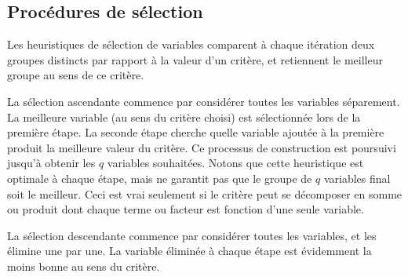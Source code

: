 \subsection{Proc\'edures de s\'election}

Les heuristiques de s\'election de variables comparent \`a chaque it\'eration 
deux groupes distincts par rapport \`a la valeur d'un crit\`ere, et
retiennent le meilleur groupe au sens de ce crit\`ere.

La s\'election ascendante commence par consid\'erer toutes les variables
s\'eparement. La meilleure variable (au sens du crit\`ere choisi) est 
s\'electionn\'ee lors de la premi\`ere \'etape. La seconde \'etape cherche
quelle variable ajout\'ee \`a la premi\`ere produit la meilleure valeur
du crit\`ere. Ce processus de construction est poursuivi jusqu'\`a obtenir
les $q$ variables souhait\'ees. Notons que cette heuristique est optimale
\`a chaque \'etape, mais ne garantit pas que le groupe de $q$ variables
final soit le meilleur. Ceci est vrai seulement si le crit\`ere peut se
d\'ecomposer en somme ou produit dont chaque terme ou facteur est
fonction d'une seule variable.

La s\'election descendante commence par consid\'erer toutes les variables,
et les \'elimine une par une. La variable \'elimin\'ee \`a chaque \'etape
est \'evidemment la moins bonne au sens du crit\`ere. 


